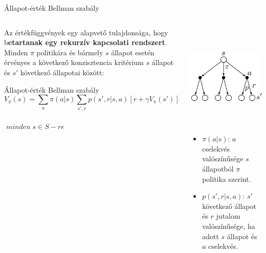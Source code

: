 \documentclass[english, aspectratio=169]{beamer}
\begin{document}
\begin{frame}{Állapot-érték Bellman szabály}
\begin{columns}
\begin{column}{.6\textwidth}
Az értékfüggvények egy alapvető tulajdonsága, hogy b\textbf{etartanak egy rekurzív kapcsolati rendszert}. Minden $\pi$ politikára és bármely $s$ állapot esetén érvényes a következő konzisztencia kritérium $s$ állapot és $s'$ következő állapotai között:
\begin{block}{Állapot-érték Bellman szabály}
\[
V_{\pi}(s)=\sum_{a}\pi(a|s)\sum_{s',r}p\left(s',r|s,a\right)\left[r + \gamma V_{\pi}\left(s'\right)\right]
\]\\
$\;minden\;s\in S-re$
\end{block}
\end{column}
\begin{column}{.45\textwidth}
\begin{center}
\includegraphics[width=5cm, height=5cm, keepaspectratio]{images/reinf_11.png}
\end{center}
\begin{itemize}
	\item $\pi(a|s)$: $a$ cselekvés valószínűsége $s$ állapotból $\pi$ politika szerint.
	\item $p\left(s',r|s,a\right)$: $s'$ következő állapot és $r$ jutalom valószínűsége, ha adott $s$ állapot és $a$ cselekvés.
\end{itemize}
\end{column}
\end{columns}
\end{frame}
\end{document}
